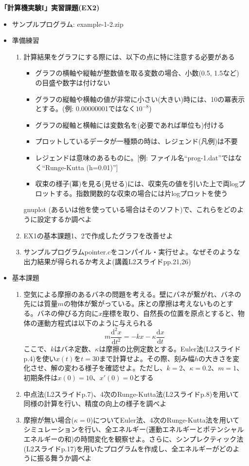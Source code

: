 \documentclass[11pt]{jarticle}
\begin{document}
\noindent
{\bf\large 「計算機実験I」実習課題(EX2)}
\\[-0.5em]

\noindent
\begin{itemize}

\item サンプルプログラム: example-1-2.zip

\item 準備練習
  \begin{enumerate}
  \item 計算結果をグラフにする際には、以下の点に特に注意する必要がある
    \begin{itemize}
    \item グラフの横軸や縦軸が整数値を取る変数の場合、小数(0.5, 1.5など)の目盛や数字は付けない
    \item グラフの縦軸や横軸の値が非常に小さい(大きい)時には、10の冪表示とする。(例: 0.00000001ではなく$10^{-8}$)
    \item グラフの縦軸と横軸には変数名を(必要であれば単位も)付ける
    \item プロットしているデータが一種類の時は、レジェンド(凡例)は不要
    \item レジェンドは意味のあるものに。[例: ファイル名``prog-1.dat''ではなく``Runge-Kutta (h=0.01)'']
    \item 収束の様子(冪)を見る(見せる)には、収束先の値を引いた上で両logプロットする。指数関数的な収束の場合には片logプロットを使う
    \end{itemize}
    gnuplot (あるいは他を使っている場合はそのソフト)で、これらをどのように設定するか調べよ
  \item EX1の基本課題1、2で作成したグラフを改善せよ
  \item サンプルプログラムpointer.cをコンパイル・実行せよ。なぜそのような出力結果が得られるか考えよ(講義L2スライドpp.21,26)
  \end{enumerate}

\item 基本課題
  \begin{enumerate}
  \item 空気による摩擦のあるバネの問題を考える。壁にバネが繋がれ、バネの先には質量$m$の物体が繋がっている。床との摩擦は考えないものとする。バネの伸びる方向に$x$座標を取り、自然長の位置を原点とすると、物体の運動方程式は以下のように与えられる
    \[
    m\frac{\mathrm{d} ^2x}{\mathrm{d} t^2} = -kx - \kappa \frac{\mathrm{d} x}{\mathrm{d} t} 
    \]
    ここで、$k$はバネ定数、$\kappa$は摩擦の比例定数とする。Euler法(L2スライドp.4)を使い$x(t)$を$t=30$まで計算せよ。その際、刻み幅$h$の大きさを変化させ、解の変わる様子を確認せよ。ただし、$k=2$、$\kappa=0.2$、$m = 1$、初期条件は$x(0)=10$、$x'(0)=0$とする
  \item 中点法(L2スライドp.7)、4次のRunge-Kutta法(L2スライドp.8)を用いて同様の計算を行い、精度の向上の様子を調べよ
  \item 摩擦が無い場合($\kappa=0$)についてEuler法、4次のRunge-Kutta法を用いてシミュレーションを行い、全エネルギー(運動エネルギーとポテンシャルエネルギーの和)の時間変化を観察せよ。さらに、シンプレクティック法(L2スライドp.17)を用いたプログラムを作成し、全エネルギーがどのように振る舞うか調べよ
  \end{enumerate}
  

\end{itemize}
\end{document}
